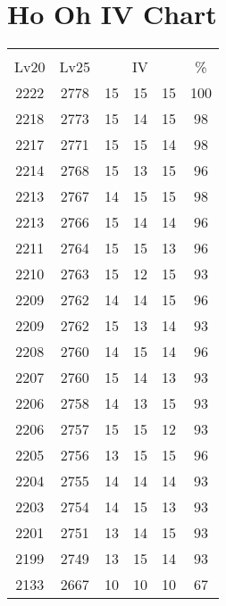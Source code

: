 \documentclass{article}%
\begin{document}
%
\normalsize%
\section{Ho Oh IV Chart}%
\label{sec:Ho Oh IV Chart}%
\renewcommand{\arraystretch}{1.5}%
\begin{tabular}{|c|c|c|c|c|c|}%
\hline%
\multicolumn{6}{|c|}{\textcolor{white}{ 
\linebreak{Ho Oh}
}%
\cellcolor{black}}\\%
\multicolumn{1}{|c}{Lv20}&\multicolumn{1}{c|}{Lv25}&\multicolumn{3}{c|}{IV}&\multicolumn{1}{|c|}{\%}\\%
\hline%
\rowcolor{color100}%
2222&2778&15&15&15&100\\%
\hline%
\rowcolor{color98}%
2218&2773&15&14&15&98\\%
\hline%
\rowcolor{color98}%
2217&2771&15&15&14&98\\%
\hline%
\rowcolor{color96}%
2214&2768&15&13&15&96\\%
\hline%
\rowcolor{color98}%
2213&2767&14&15&15&98\\%
\hline%
\rowcolor{color96}%
2213&2766&15&14&14&96\\%
\hline%
\rowcolor{color96}%
2211&2764&15&15&13&96\\%
\hline%
\rowcolor{color93}%
2210&2763&15&12&15&93\\%
\hline%
\rowcolor{color96}%
2209&2762&14&14&15&96\\%
\hline%
\rowcolor{color93}%
2209&2762&15&13&14&93\\%
\hline%
\rowcolor{color96}%
2208&2760&14&15&14&96\\%
\hline%
\rowcolor{color93}%
2207&2760&15&14&13&93\\%
\hline%
\rowcolor{color93}%
2206&2758&14&13&15&93\\%
\hline%
\rowcolor{color93}%
2206&2757&15&15&12&93\\%
\hline%
\rowcolor{color96}%
2205&2756&13&15&15&96\\%
\hline%
\rowcolor{color93}%
2204&2755&14&14&14&93\\%
\hline%
\rowcolor{color93}%
2203&2754&14&15&13&93\\%
\hline%
\rowcolor{color93}%
2201&2751&13&14&15&93\\%
\hline%
\rowcolor{color93}%
2199&2749&13&15&14&93\\%
\hline%
\rowcolor{color91}%
2133&2667&10&10&10&67\\%
\end{tabular}

%
\end{document}
